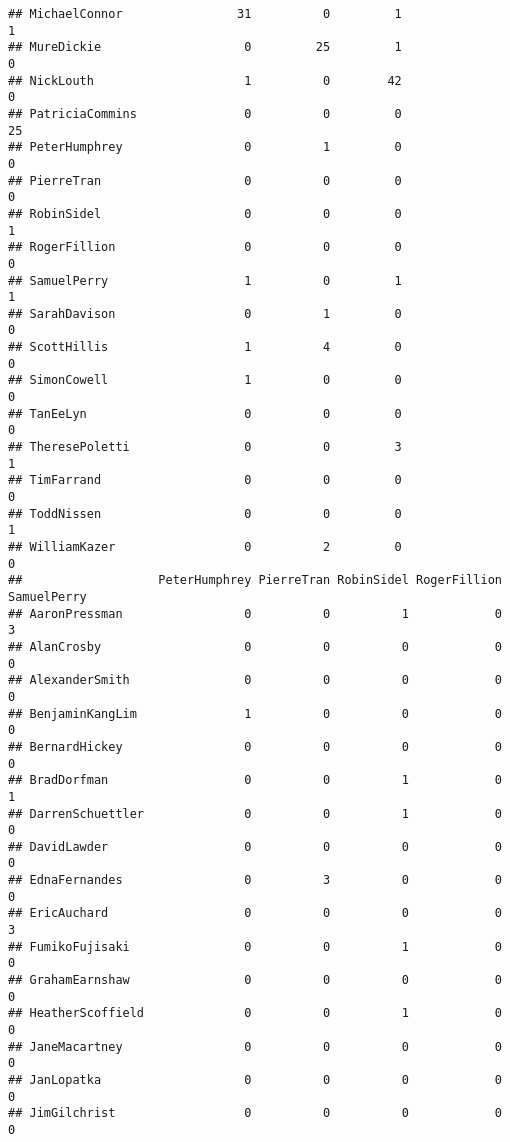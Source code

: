 \documentclass[
  12pt,
]{article}
\begin{document}
\begin{verbatim}
## MichaelConnor                31          0         1               1
## MureDickie                    0         25         1               0
## NickLouth                     1          0        42               0
## PatriciaCommins               0          0         0              25
## PeterHumphrey                 0          1         0               0
## PierreTran                    0          0         0               0
## RobinSidel                    0          0         0               1
## RogerFillion                  0          0         0               0
## SamuelPerry                   1          0         1               1
## SarahDavison                  0          1         0               0
## ScottHillis                   1          4         0               0
## SimonCowell                   1          0         0               0
## TanEeLyn                      0          0         0               0
## TheresePoletti                0          0         3               1
## TimFarrand                    0          0         0               0
## ToddNissen                    0          0         0               1
## WilliamKazer                  0          2         0               0
##                   PeterHumphrey PierreTran RobinSidel RogerFillion SamuelPerry
## AaronPressman                 0          0          1            0           3
## AlanCrosby                    0          0          0            0           0
## AlexanderSmith                0          0          0            0           0
## BenjaminKangLim               1          0          0            0           0
## BernardHickey                 0          0          0            0           0
## BradDorfman                   0          0          1            0           1
## DarrenSchuettler              0          0          1            0           0
## DavidLawder                   0          0          0            0           0
## EdnaFernandes                 0          3          0            0           0
## EricAuchard                   0          0          0            0           3
## FumikoFujisaki                0          0          1            0           0
## GrahamEarnshaw                0          0          0            0           0
## HeatherScoffield              0          0          1            0           0
## JaneMacartney                 0          0          0            0           0
## JanLopatka                    0          0          0            0           0
## JimGilchrist                  0          0          0            0           0

\end{verbatim}
\end{document}
